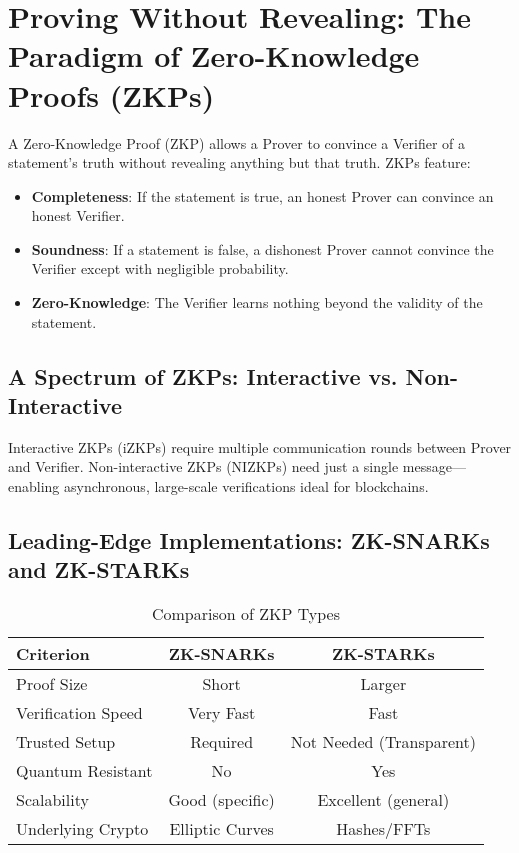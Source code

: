 \section{Proving Without Revealing: The Paradigm of Zero-Knowledge Proofs (ZKPs)}

A Zero-Knowledge Proof (ZKP) allows a Prover to convince a Verifier of a statement's truth without revealing anything but that truth. ZKPs feature:
\begin{itemize}
    \item \textbf{Completeness}: If the statement is true, an honest Prover can convince an honest Verifier.
    \item \textbf{Soundness}: If a statement is false, a dishonest Prover cannot convince the Verifier except with negligible probability.
    \item \textbf{Zero-Knowledge}: The Verifier learns nothing beyond the validity of the statement.
\end{itemize}

\subsection{A Spectrum of ZKPs: Interactive vs. Non-Interactive}
Interactive ZKPs (iZKPs) require multiple communication rounds between Prover and Verifier. Non-interactive ZKPs (NIZKPs) need just a single message—enabling asynchronous, large-scale verifications ideal for blockchains.

\subsection{Leading-Edge Implementations: ZK-SNARKs and ZK-STARKs}
\begin{table}[h]
\centering
\caption{Comparison of ZKP Types}
\begin{tabular}{|l|c|c|}
\hline
\textbf{Criterion} & \textbf{ZK-SNARKs} & \textbf{ZK-STARKs} \\
\hline
Proof Size & Short & Larger \\
Verification Speed & Very Fast & Fast \\
Trusted Setup & Required & Not Needed (Transparent) \\
Quantum Resistant & No & Yes \\
Scalability & Good (specific) & Excellent (general) \\
Underlying Crypto & Elliptic Curves & Hashes/\newline FFTs \\
\hline
\end{tabular}
\end{table}

